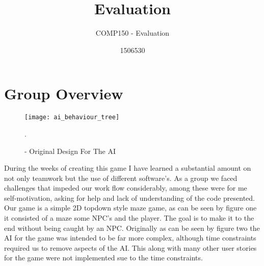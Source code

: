 \documentclass{scrartcl}
\title{Evaluation}
\subtitle{COMP150 - Evaluation}
\author{1506530}
\begin{document}
\maketitle

\section{Group Overview}
\begin{figure}[h]
	\centering
	\texttt{[image: ai\_behaviour\_tree]}
	\caption{ - Original Design For The AI }.
	\label{ai_behaviour_tree}
\end{figure}

During the weeks of creating this game I have learned a substantial amount on not only teamwork but the use of different software's. As a group we faced challenges that impeded our work flow considerably, among these were for me self-motivation, asking for help and lack of understanding of the code presented. Our game is a simple 2D topdown style maze game, as can be seen by figure one it consisted of a maze some NPC's and the player. The goal is to make it to the end without being caught by an NPC. Originally as can be seen by figure two the AI for the game was intended to be far more complex, although time constraints required us to remove aspects of the AI. This along with many other user stories for the game were not implemented sue to the time constraints.
\end{document}
